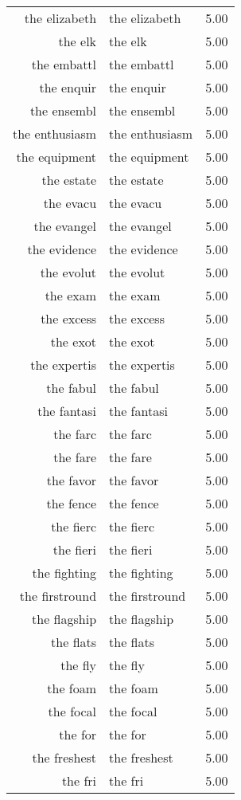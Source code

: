 \begin{table}[ht]
\begin{tabular}{rlr}
  the elizabeth & the elizabeth & 5.00 \\ 
  the elk & the elk & 5.00 \\ 
  the embattl & the embattl & 5.00 \\ 
  the enquir & the enquir & 5.00 \\ 
  the ensembl & the ensembl & 5.00 \\ 
  the enthusiasm & the enthusiasm & 5.00 \\ 
  the equipment & the equipment & 5.00 \\ 
  the estate & the estate & 5.00 \\ 
  the evacu & the evacu & 5.00 \\ 
  the evangel & the evangel & 5.00 \\ 
  the evidence & the evidence & 5.00 \\ 
  the evolut & the evolut & 5.00 \\ 
  the exam & the exam & 5.00 \\ 
  the excess & the excess & 5.00 \\ 
  the exot & the exot & 5.00 \\ 
  the expertis & the expertis & 5.00 \\ 
  the fabul & the fabul & 5.00 \\ 
  the fantasi & the fantasi & 5.00 \\ 
  the farc & the farc & 5.00 \\ 
  the fare & the fare & 5.00 \\ 
  the favor & the favor & 5.00 \\ 
  the fence & the fence & 5.00 \\ 
  the fierc & the fierc & 5.00 \\ 
  the fieri & the fieri & 5.00 \\ 
  the fighting & the fighting & 5.00 \\ 
  the firstround & the firstround & 5.00 \\ 
  the flagship & the flagship & 5.00 \\ 
  the flats & the flats & 5.00 \\ 
  the fly & the fly & 5.00 \\ 
  the foam & the foam & 5.00 \\ 
  the focal & the focal & 5.00 \\ 
  the for & the for & 5.00 \\ 
  the freshest & the freshest & 5.00 \\ 
  the fri & the fri & 5.00 \\ 

\end{tabular}
\end{table}
